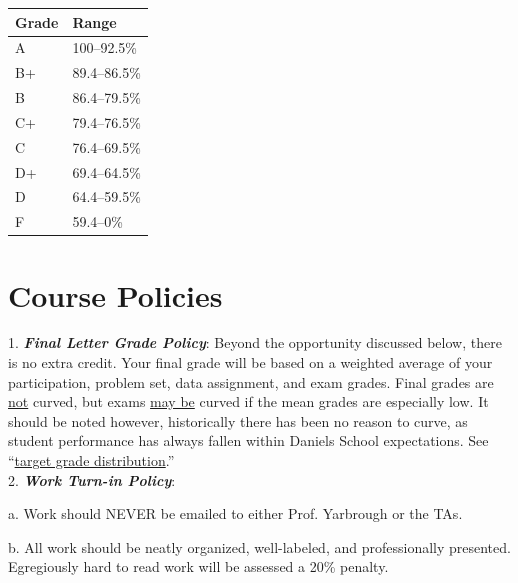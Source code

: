 \documentclass[11pt]{article}
\begin{document}
\begin{tabular}[]{l|l}
	
	Grade & Range \\
	
	\hline
	
	A & 100--92.5\%\\
	
	B+ & 89.4--86.5\%\\
	
	B & 86.4--79.5\%\\
	
	C+ & 79.4--76.5\%\\
	
	C & 76.4--69.5\% \\
	
	D+ & 69.4--64.5\% \\
	
	D  & 64.4--59.5\% \\
	
	F & 59.4--0\%\\
	
\end{tabular}


	\pagebreak

\section{Course Policies}


1. \textit{\textbf{Final Letter Grade Policy}}: Beyond the opportunity discussed below, there is no extra credit. Your final grade will be based on a weighted average of your participation, problem set, data assignment, and exam grades. Final grades are \underline{not} curved, but exams \underline{may be} curved if the mean grades are especially low. It should be noted however, historically there has been no reason to curve, as student performance has always fallen within Daniels School expectations. See ``\href{https://business.purdue.edu/undergraduate/current-students/advising-policies.php}{target grade distribution}.''    \\

2. \textbf{\textit{Work Turn-in Policy}}: 

\hspace{0.25in} a. Work should NEVER be emailed to either Prof. Yarbrough or the TAs.  

\hspace{0.25in} b. All work should be neatly organized, well-labeled, and professionally presented. Egregiously hard to read work will be assessed a 20\% penalty.
\end{document}
